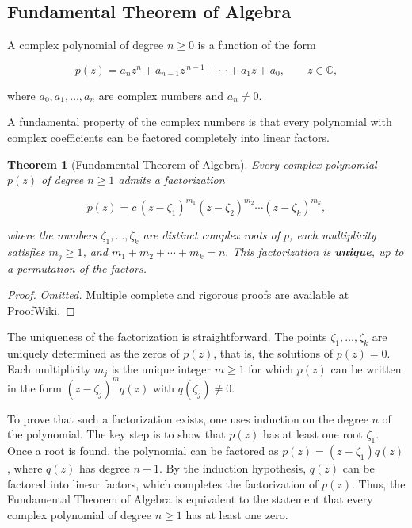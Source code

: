 \documentclass[
]{book}
\newtheorem{theorem}{Theorem}[chapter]
\theoremstyle{definition}
\theoremstyle{definition}
\theoremstyle{definition}
\theoremstyle{definition}
\theoremstyle{remark}
\begin{document}
\subsection{Fundamental Theorem of Algebra}\label{fundamental-theorem-of-algebra}

A complex polynomial of degree \(n \ge 0\) is a function of the form

\[
p(z) = a_n z^n + a_{n-1} z^{\,n-1} + \cdots + a_1 z + a_0,
\qquad z \in \mathbb{C},
\]

where \(a_0, a_1, \ldots, a_n\) are complex numbers and \(a_n \neq 0\).

A fundamental property of the complex numbers is that every polynomial
with complex coefficients can be factored completely into linear factors.

\begin{theorem}[Fundamental Theorem of Algebra]
\protect\hypertarget{thm:unnamed-chunk-5}{}\label{thm:unnamed-chunk-5}Every complex polynomial \(p(z)\) of degree \(n \ge 1\) admits a factorization

\[
p(z) = c\,(z - \zeta_1)^{m_1} (z - \zeta_2)^{m_2} \cdots (z - \zeta_k)^{m_k},
\]

where the numbers \(\zeta_1, \ldots, \zeta_k\) are distinct complex roots of \(p\),
each multiplicity satisfies \(m_j \ge 1\), and \(m_1 + m_2 + \cdots + m_k = n.\)
This factorization is \textbf{unique}, up to a permutation of the factors.
\end{theorem}

\begin{proof}
\emph{Omitted.} Multiple complete and rigorous proofs are available at
\href{https://proofwiki.org/wiki/Fundamental_Theorem_of_Algebra}{ProofWiki}.
\end{proof}

The uniqueness of the factorization is straightforward.
The points \(\zeta_1, \ldots, \zeta_k\) are uniquely determined as the zeros of \(p(z)\),
that is, the solutions of \(p(z)=0\). Each multiplicity \(m_j\) is the unique
integer \(m \ge 1\) for which \(p(z)\) can be written in the form
\((z-\zeta_j)^m q(z)\) with \(q(\zeta_j)\neq 0\).

To prove that such a factorization exists, one uses induction on the degree
\(n\) of the polynomial. The key step is to show that \(p(z)\) has at least one
root \(\zeta_1\). Once a root is found, the polynomial can be factored as
\(p(z) = (z-\zeta_1) q(z)\), where \(q(z)\) has degree \(n-1\). By the induction
hypothesis, \(q(z)\) can be factored into linear factors, which completes the
factorization of \(p(z)\). Thus, the Fundamental Theorem of Algebra is
equivalent to the statement that every complex polynomial of degree
\(n \ge 1\) has at least one zero.
\end{document}
